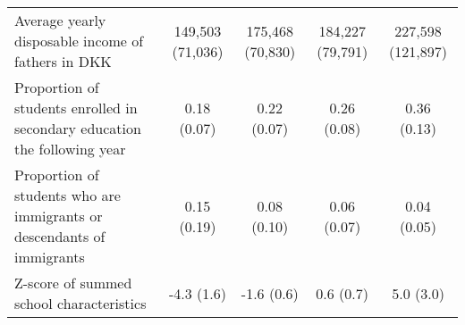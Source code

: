 \documentclass{article}
\begin{document}
\begin{table}[]
{\begin{tabular}{lcccc}
Average yearly disposable income of fathers in DKK                        & 149,503 (71,036)                                                                                          & 175,468 (70,830)                                                                                                                            & 184,227 (79,791)                                                                                                                            & 227,598 (121,897)                                                                                                                            \\
Proportion of students enrolled in secondary education the following year & 0.18 (0.07)                                                                                               & 0.22 (0.07)                                                                                                                                 & 0.26 (0.08)                                                                                                                                 & 0.36 (0.13)                                                                                                                                  \\
Proportion of students who are immigrants or descendants of immigrants    & 0.15 (0.19)                                                                                               & 0.08 (0.10)                                                                                                                                 & 0.06 (0.07)                                                                                                                                 & 0.04 (0.05)                                                                                                                                  \\
Z-score of summed school characteristics                                  & -4.3 (1.6)                                                                                                & -1.6 (0.6)                                                                                                                                  & 0.6 (0.7)                                                                                                                                   & 5.0 (3.0)                                                                                                                                    \\ \hline
\end{tabular}%
}
\end{table}
\end{document}
